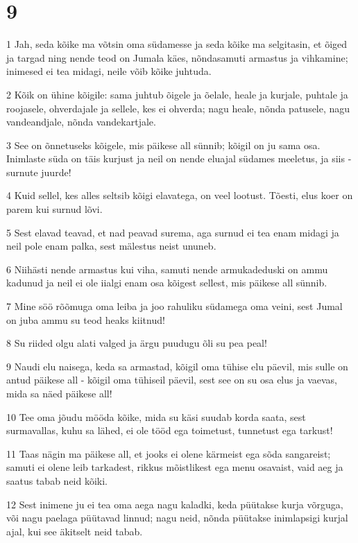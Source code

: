 \chapter{9}

\par 1 Jah, seda kõike ma võtsin oma südamesse ja seda kõike ma selgitasin, et õiged ja targad ning nende teod on Jumala käes, nõndasamuti armastus ja vihkamine; inimesed ei tea midagi, neile võib kõike juhtuda.
\par 2 Kõik on ühine kõigile: sama juhtub õigele ja õelale, heale ja kurjale, puhtale ja roojasele, ohverdajale ja sellele, kes ei ohverda; nagu heale, nõnda patusele, nagu vandeandjale, nõnda vandekartjale.
\par 3 See on õnnetuseks kõigele, mis päikese all sünnib; kõigil on ju sama osa. Inimlaste süda on täis kurjust ja neil on nende eluajal südames meeletus, ja siis - surnute juurde!
\par 4 Kuid sellel, kes alles seltsib kõigi elavatega, on veel lootust. Tõesti, elus koer on parem kui surnud lõvi.
\par 5 Sest elavad teavad, et nad peavad surema, aga surnud ei tea enam midagi ja neil pole enam palka, sest mälestus neist ununeb.
\par 6 Niihästi nende armastus kui viha, samuti nende armukadeduski on ammu kadunud ja neil ei ole iialgi enam osa kõigest sellest, mis päikese all sünnib.
\par 7 Mine söö rõõmuga oma leiba ja joo rahuliku südamega oma veini, sest Jumal on juba ammu su teod heaks kiitnud!
\par 8 Su riided olgu alati valged ja ärgu puudugu õli su pea peal!
\par 9 Naudi elu naisega, keda sa armastad, kõigil oma tühise elu päevil, mis sulle on antud päikese all - kõigil oma tühiseil päevil, sest see on su osa elus ja vaevas, mida sa näed päikese all!
\par 10 Tee oma jõudu mööda kõike, mida su käsi suudab korda saata, sest surmavallas, kuhu sa lähed, ei ole tööd ega toimetust, tunnetust ega tarkust!
\par 11 Taas nägin ma päikese all, et jooks ei olene kärmeist ega sõda sangareist; samuti ei olene leib tarkadest, rikkus mõistlikest ega menu osavaist, vaid aeg ja saatus tabab neid kõiki.
\par 12 Sest inimene ju ei tea oma aega nagu kaladki, keda püütakse kurja võrguga, või nagu paelaga püütavad linnud; nagu neid, nõnda püütakse inimlapsigi kurjal ajal, kui see äkitselt neid tabab.
